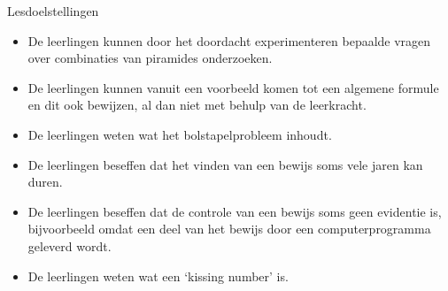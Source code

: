 \documentclass[dutch]{beamer}
\begin{document}
\begin{frame}{Lesdoelstellingen}
\begin{itemize}
\item De leerlingen kunnen door het doordacht experimenteren bepaalde vragen over combinaties van piramides onderzoeken.
\item De leerlingen kunnen vanuit een voorbeeld komen tot een algemene formule en dit ook bewijzen, al dan niet met behulp van de leerkracht.
\item De leerlingen weten wat het bolstapelprobleem inhoudt.
\item De leerlingen beseffen dat het vinden van een bewijs soms vele jaren kan duren.
\item De leerlingen beseffen dat de controle van een bewijs soms geen evidentie is, bijvoorbeeld omdat een deel van het bewijs door een computerprogramma geleverd wordt.
\item De leerlingen weten wat een `kissing number' is.
\end{itemize}
\end{frame}



\end{document}
